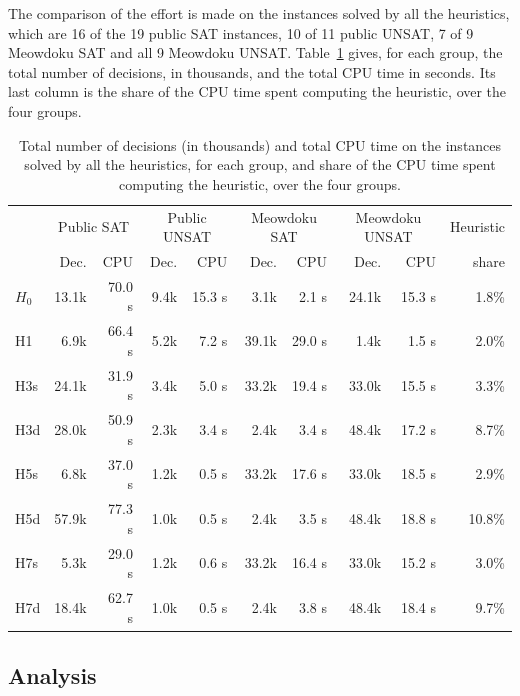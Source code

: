 The comparison of the effort is made on the instances solved by all the heuristics, which are 16 of the 19 public SAT instances, 10 of 11 public UNSAT, 7 of 9 Meowdoku SAT and all 9 Meowdoku UNSAT. Table~\ref{tab:q5-effort} gives, for each group, the total number of decisions, in thousands, and the total CPU time in seconds. Its last column is the share of the CPU time spent computing the heuristic, over the four groups.
\begin{table}[H]
\centering
\small
\begin{tabular}{@{}lrrrrrrrrr@{}}
\toprule
 & \multicolumn{2}{c}{Public SAT} & \multicolumn{2}{c}{Public UNSAT} & \multicolumn{2}{c}{Meowdoku SAT} & \multicolumn{2}{c}{Meowdoku UNSAT} & Heuristic\\
 & Dec. & CPU & Dec. & CPU & Dec. & CPU & Dec. & CPU & share\\
\midrule
$H_0$ & 13.1k & 70.0 s & 9.4k & 15.3 s & 3.1k & 2.1 s & 24.1k & 15.3 s & 1.8\%\\
H1 & 6.9k & 66.4 s & 5.2k & 7.2 s & 39.1k & 29.0 s & 1.4k & 1.5 s & 2.0\%\\
H3s & 24.1k & 31.9 s & 3.4k & 5.0 s & 33.2k & 19.4 s & 33.0k & 15.5 s & 3.3\%\\
H3d & 28.0k & 50.9 s & 2.3k & 3.4 s & 2.4k & 3.4 s & 48.4k & 17.2 s & 8.7\%\\
H5s & 6.8k & 37.0 s & 1.2k & 0.5 s & 33.2k & 17.6 s & 33.0k & 18.5 s & 2.9\%\\
H5d & 57.9k & 77.3 s & 1.0k & 0.5 s & 2.4k & 3.5 s & 48.4k & 18.8 s & 10.8\%\\
H7s & 5.3k & 29.0 s & 1.2k & 0.6 s & 33.2k & 16.4 s & 33.0k & 15.2 s & 3.0\%\\
H7d & 18.4k & 62.7 s & 1.0k & 0.5 s & 2.4k & 3.8 s & 48.4k & 18.4 s & 9.7\%\\
\bottomrule
\end{tabular}
\caption{Total number of decisions (in thousands) and total CPU time on the instances solved by all the heuristics, for each group, and share of the CPU time spent computing the heuristic, over the four groups.}
\label{tab:q5-effort}
\end{table}

\subsection{Analysis}

